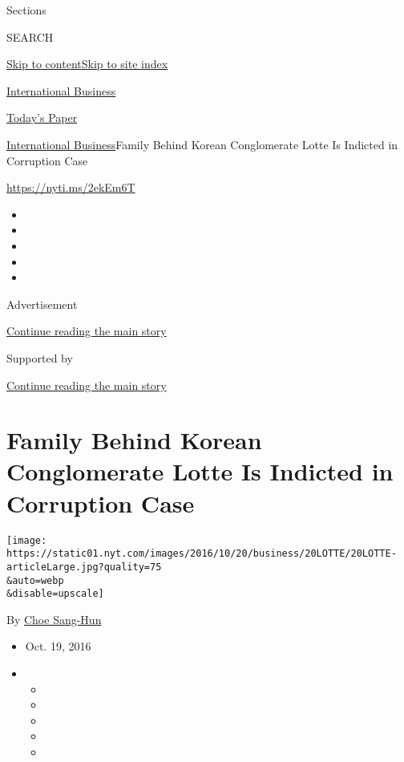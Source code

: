 Sections

SEARCH

\protect\hyperlink{site-content}{Skip to
content}\protect\hyperlink{site-index}{Skip to site index}

\href{https://www.nytimes.com/section/business}{International Business}

\href{https://myaccount.nytimes.com/auth/login?response_type=cookie\&client_id=vi}{}

\href{https://www.nytimes.com/section/todayspaper}{Today's Paper}

\href{/section/business}{International Business}\textbar{}Family Behind
Korean Conglomerate Lotte Is Indicted in Corruption Case

\url{https://nyti.ms/2ekEm6T}

\begin{itemize}
\item
\item
\item
\item
\item
\end{itemize}

Advertisement

\protect\hyperlink{after-top}{Continue reading the main story}

Supported by

\protect\hyperlink{after-sponsor}{Continue reading the main story}

\hypertarget{family-behind-korean-conglomerate-lotte-is-indicted-in-corruption-case}{%
\section{Family Behind Korean Conglomerate Lotte Is Indicted in
Corruption
Case}\label{family-behind-korean-conglomerate-lotte-is-indicted-in-corruption-case}}

\texttt{[image: https://static01.nyt.com/images/2016/10/20/business/20LOTTE/20LOTTE-articleLarge.jpg?quality=75\\\&auto=webp\\\&disable=upscale]}

By \href{http://www.nytimes.com/by/choe-sang-hun}{Choe Sang-Hun}

\begin{itemize}
\item
  Oct. 19, 2016
\item
  \begin{itemize}
  \item
  \item
  \item
  \item
  \item
  \end{itemize}
\end{itemize}

